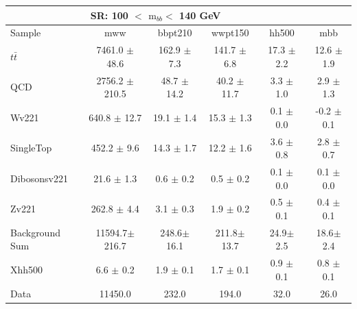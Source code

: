 \documentclass{beamer}
\newcommand*{\ttbar}{\ensuremath{t\bar{t}}\xspace}
\newcommand*{\mbb}{\ensuremath{\text{m}_{bb}}\xspace}
\newcommand*{\header}[1]{\fontsize{16}{8}\selectfont \textbf{{\color{MyPurple}{#1}}}}
\begin{document}
\begin{frame}
\begin{center}
\header{m500 SR}
\end{center}
\begin{table}
\tiny
\begin{tabular}{l|c|c|c|c|c}
\hline\hline
\multicolumn{5}{c}{\textbf{SR}: 100 $<$ \mbb $<$ 140 GeV}\\\hline\hline
Sample  	& mww 	& bbpt210 	& wwpt150 	& hh500 	& mbb  \\\hline
\ttbar 	& 7461.0 $\pm$ 48.6 	& 162.9 $\pm$ 7.3 	& 141.7 $\pm$ 6.8 	& 17.3 $\pm$ 2.2 	& 12.6 $\pm$ 1.9	\\\hline 
QCD 	& 2756.2 $\pm$ 210.5 	& 48.7 $\pm$ 14.2 	& 40.2 $\pm$ 11.7 	& 3.3 $\pm$ 1.0 	& 2.9 $\pm$ 1.3	\\\hline 
Wv221 	& 640.8 $\pm$ 12.7 	& 19.1 $\pm$ 1.4 	& 15.3 $\pm$ 1.3 	& 0.1 $\pm$ 0.0 	& -0.2 $\pm$ 0.1	\\\hline 
SingleTop 	& 452.2 $\pm$ 9.6 	& 14.3 $\pm$ 1.7 	& 12.2 $\pm$ 1.6 	& 3.6 $\pm$ 0.8 	& 2.8 $\pm$ 0.7	\\\hline 
Dibosonsv221 	& 21.6 $\pm$ 1.3 	& 0.6 $\pm$ 0.2 	& 0.5 $\pm$ 0.2 	& 0.1 $\pm$ 0.0 	& 0.1 $\pm$ 0.0	\\\hline 
Zv221 	& 262.8 $\pm$ 4.4 	& 3.1 $\pm$ 0.3 	& 1.9 $\pm$ 0.2 	& 0.5 $\pm$ 0.1 	& 0.4 $\pm$ 0.1	\\\hline 
\hline
Background Sum 	& 11594.7$\pm$ 216.7 	& 248.6$\pm$ 16.1 	& 211.8$\pm$ 13.7 	& 24.9$\pm$ 2.5 	& 18.6$\pm$ 2.4	\\\hline 
\hline
Xhh500 	& 6.6 $\pm$ 0.2 	& 1.9 $\pm$ 0.1 	& 1.7 $\pm$ 0.1 	& 0.9 $\pm$ 0.1 	& 0.8 $\pm$ 0.1	\\\hline 
Data 	& 11450.0 	& 232.0 	& 194.0 	& 32.0 	& 26.0	\\\hline 
\end{tabular}
\end{table}
\end{frame}
\end{document}
